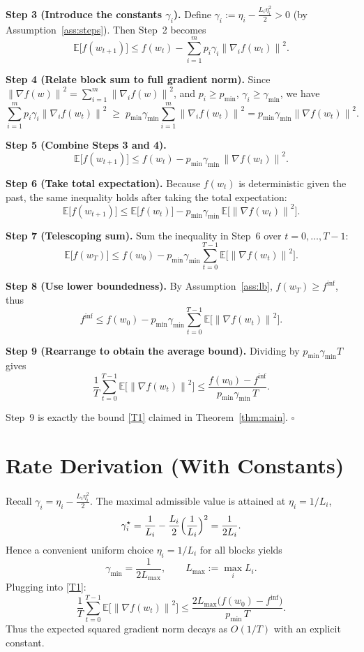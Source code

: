 \documentclass{article}
\newcommand{\E}{\mathbb{E}}
\newcommand{\norm}[1]{\left\lVert #1\right\rVert}
\begin{document}
\noindent\textbf{Step 3 (Introduce the constants $\gamma_i$).}
Define $\gamma_i:=\eta_i-\frac{L_i\eta_i^{2}}{2}>0$ (by Assumption~\ref{ass:steps}).
Then Step~2 becomes
\[
\E\!\bigl[f(w_{t+1})\bigr]\le
f(w_t)-\sum_{i=1}^{m}p_i\gamma_i\norm{\nabla_{i}f(w_t)}^{2}.
\tag{Step 3}
\]

\noindent\textbf{Step 4 (Relate block sum to full gradient norm).}
Since $\norm{\nabla f(w)}^{2}=\sum_{i=1}^{m}\norm{\nabla_i f(w)}^{2}$,
and $p_i\ge p_{\min}$, $\gamma_i\ge\gamma_{\min}$, we have
\[
\sum_{i=1}^{m}p_i\gamma_i\norm{\nabla_i f(w_t)}^{2}
\;\ge\;
p_{\min}\gamma_{\min}\sum_{i=1}^{m}\norm{\nabla_i f(w_t)}^{2}
=
p_{\min}\gamma_{\min}\norm{\nabla f(w_t)}^{2}.
\tag{Step 4}
\]

\noindent\textbf{Step 5 (Combine Steps 3 and 4).}
\[
\E\!\bigl[f(w_{t+1})\bigr]\le
f(w_t)-p_{\min}\gamma_{\min}\,\norm{\nabla f(w_t)}^{2}.
\tag{Step 5}
\]

\noindent\textbf{Step 6 (Take total expectation).}
Because $f(w_t)$ is deterministic given the past, the same inequality holds after taking the total expectation:
\[
\E\!\bigl[f(w_{t+1})\bigr]\le
\E\!\bigl[f(w_t)\bigr]-p_{\min}\gamma_{\min}\,
      \E\!\bigl[\norm{\nabla f(w_t)}^{2}\bigr].
\tag{Step 6}
\]

\noindent\textbf{Step 7 (Telescoping sum).}
Sum the inequality in Step~6 over $t=0,\dots,T-1$:
\[
\E\!\bigl[f(w_T)\bigr]\le
f(w_0)-p_{\min}\gamma_{\min}\sum_{t=0}^{T-1}
      \E\!\bigl[\norm{\nabla f(w_t)}^{2}\bigr].
\tag{Step 7}
\]

\noindent\textbf{Step 8 (Use lower boundedness).}
By Assumption~\ref{ass:lb}, $f(w_T)\ge f^{\inf}$, thus
\[
f^{\inf}\le f(w_0)-p_{\min}\gamma_{\min}
      \sum_{t=0}^{T-1}\E\!\bigl[\norm{\nabla f(w_t)}^{2}\bigr].
\tag{Step 8}
\]

\noindent\textbf{Step 9 (Rearrange to obtain the average bound).}
Dividing by $p_{\min}\gamma_{\min}T$ gives
\[
\frac{1}{T}\sum_{t=0}^{T-1}\E\!\bigl[\norm{\nabla f(w_t)}^{2}\bigr]
\le
\frac{f(w_0)-f^{\inf}}{p_{\min}\gamma_{\min}\,T}.
\tag{Step 9}
\]

Step~9 is exactly the bound \eqref{T1} claimed in Theorem~\ref{thm:main}. $\square$

\section*{Rate Derivation (With Constants)}
Recall $\gamma_i=\eta_i-\tfrac{L_i\eta_i^{2}}{2}$. The maximal admissible value is attained at $\eta_i=1/L_i$,
\[
\gamma_i^{\star}
= \frac{1}{L_i}-\frac{L_i}{2}\Bigl(\frac{1}{L_i}\Bigr)^{2}
= \frac{1}{2L_i}.
\]
Hence a convenient uniform choice $\eta_i=1/L_i$ for all blocks yields
\[
\gamma_{\min}=\frac{1}{2L_{\max}},\qquad
L_{\max}:=\max_{i}L_i .
\]
Plugging into \eqref{T1}:
\[
\frac{1}{T}\sum_{t=0}^{T-1}\E\!\bigl[\norm{\nabla f(w_t)}^{2}\bigr]
\le
\frac{2L_{\max}\bigl(f(w_0)-f^{\inf}\bigr)}{p_{\min}\,T}.
\tag{R1}
\]
Thus the expected squared gradient norm decays as $O(1/T)$ with an explicit constant.
\end{document}
